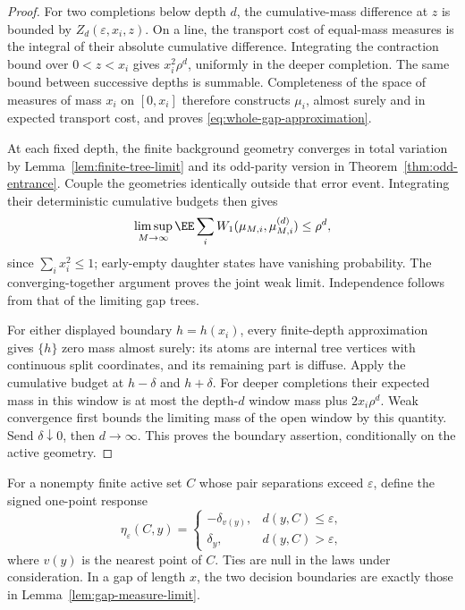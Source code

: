 \documentclass[11pt,letterpaper]{article}
\begin{document}
\begin{proof}
For two completions below depth $d$, the cumulative-mass difference at
$z$ is bounded by $Z_d(\varepsilon,x_i,z)$. On a line, the transport
cost of equal-mass measures is the integral of their absolute cumulative
difference. Integrating the contraction bound over $0<z<x_i$ gives
$x_i^2\rho^d$, uniformly in the deeper completion. The same bound between
successive depths is summable. Completeness of the space of measures of
mass $x_i$ on $[0,x_i]$ therefore constructs $\mu_i$, almost surely and
in expected transport cost, and proves \eqref{eq:whole-gap-approximation}.

At each fixed depth, the finite background geometry converges in total
variation by Lemma~\ref{lem:finite-tree-limit} and its odd-parity version
in Theorem~\ref{thm:odd-entrance}. Couple the geometries identically outside
that error event. Integrating their deterministic cumulative budgets
then gives
\[
 \limsup_{M\to\infty}\EE\sum_i
 W_1(\mu_{M,i},\mu_{M,i}^{(d)})\le\rho^d,
\]
since $\sum_i x_i^2\le1$; early-empty daughter states have vanishing
probability. The converging-together argument proves the joint weak
limit. Independence follows from that of the limiting gap trees.

For either displayed boundary $h=h(x_i)$, every finite-depth
approximation gives $\{h\}$ zero mass almost surely: its atoms are
internal tree vertices with continuous split coordinates, and its
remaining part is diffuse. Apply the cumulative budget at $h-\delta$
and $h+\delta$. For deeper completions their expected mass in this
window is at most the depth-$d$ window mass plus $2x_i\rho^d$.
Weak convergence first bounds the limiting mass of the open window
by this quantity. Send $\delta\downarrow0$, then $d\to\infty$.
This proves the boundary assertion, conditionally on the active geometry.
\end{proof}

For a nonempty finite active set $C$ whose pair separations exceed
$\varepsilon$, define the signed one-point response
\begin{equation}\label{eq:cutoff-response}
 \eta_\varepsilon(C,y)=
 \begin{cases}
 -\delta_{v(y)},&d(y,C)\le\varepsilon,\\
 \delta_y,&d(y,C)>\varepsilon,
 \end{cases}
\end{equation}
where $v(y)$ is the nearest point of $C$. Ties are null in the laws
under consideration. In a gap of length $x$, the two decision
boundaries are exactly those in Lemma~\ref{lem:gap-measure-limit}.
\end{document}
